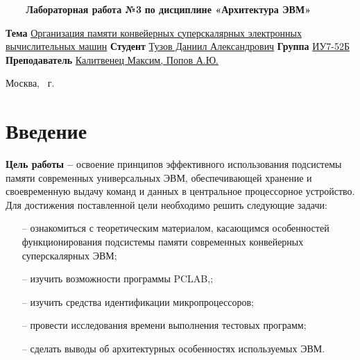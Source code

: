 \documentclass{article}
\begin{document}
\begin{titlepage}
	\noindent\begin{minipage}{1.0\textwidth}\centering
		\Large\textbf{   ~~~ Лабораторная работа №3}\newline
		\textbf{по дисциплине «Архитектура ЭВМ»}\newline\newline\newline\newline\newline
	\end{minipage}

	\noindent\textbf{Тема} \underline{Организация памяти конвейерных суперскалярных электронных вычислительных машин}
\newline\newline
	\textbf{Студент} \underline{Тузов Даниил Александрович}\newline\newline
	\textbf{Группа} \underline{ИУ7-52Б}\newline\newline
	\textbf{Преподаватель} \underline{Калитвенец Максим, Попов А.Ю.}
	
	\begin{center}
		\vfill
		Москва, \the\year ~г.
	\end{center}
	\restoregeometry
	\clearpage
\end{titlepage}

\section{Введение}
\textbf{Цель работы --} освоение принципов эффективного использования подсистемы памяти современных универсальных 
ЭВМ, обеспечивающей хранение и своевременную выдачу команд и данных в центральное процессорное устройство.  
Для достижения поставленной цели необходимо решить следующие задачи:
\begin{itemize}
	\item[--] ознакомиться с теоретическим материалом, касающимся особенностей функционирования подсистемы памяти 
современных конвейерных суперскалярных ЭВМ;
	\item[--] изучить возможности программы PCLAB,;
	\item[--] изучить средства идентификации микропроцессоров;
	\item[--] провести исследования времени выполнения тестовых программ;
	\item[--] сделать выводы об архитектурных особенностях используемых ЭВМ.
\end{itemize}
\end{document}
